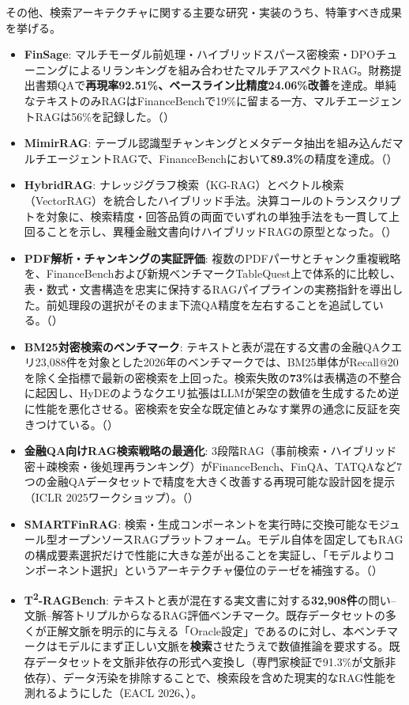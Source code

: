 その他、検索アーキテクチャに関する主要な研究・実装のうち、特筆すべき成果を挙げる。

\begin{itemize}
  \item \textbf{FinSage}: マルチモーダル前処理・ハイブリッドスパース密検索・DPOチューニングによるリランキングを組み合わせたマルチアスペクトRAG。財務提出書類QAで\textbf{再現率92.51\%、ベースライン比精度24.06\%改善}を達成。単純なテキストのみRAGはFinanceBenchで19\%に留まる一方、マルチエージェントRAGは56\%を記録した。（\cite{finsage2025}）
  \item \textbf{MimirRAG}: テーブル認識型チャンキングとメタデータ抽出を組み込んだマルチエージェントRAGで、FinanceBenchにおいて\textbf{89.3\%}の精度を達成。（\cite{mimirrag2026}）
  \item \textbf{HybridRAG}: ナレッジグラフ検索（KG-RAG）とベクトル検索（VectorRAG）を統合したハイブリッド手法。決算コールのトランスクリプトを対象に、検索精度・回答品質の両面でいずれの単独手法をも一貫して上回ることを示し、異種金融文書向けハイブリッドRAGの原型となった。（\cite{hybridrag2024}）
  \item \textbf{PDF解析・チャンキングの実証評価}: 複数のPDFパーサとチャンク重複戦略を、FinanceBenchおよび新規ベンチマークTableQuest上で体系的に比較し、表・数式・文書構造を忠実に保持するRAGパイプラインの実務指針を導出した。前処理段の選択がそのまま下流QA精度を左右することを追試している。（\cite{pdfparsingrag2026}）
  \item \textbf{BM25対密検索のベンチマーク}: テキストと表が混在する文書の金融QAクエリ23,088件を対象とした2026年のベンチマークでは、BM25単体がRecall@20を除く全指標で最新の密検索を上回った。検索失敗の\textbf{73\%}は表構造の不整合に起因し、HyDEのようなクエリ拡張はLLMが架空の数値を生成するため逆に性能を悪化させる。密検索を安全な既定値とみなす業界の通念に反証を突きつけている。（\cite{bm25hybrid2026}）
  \item \textbf{金融QA向けRAG検索戦略の最適化}: 3段階RAG（事前検索・ハイブリッド密＋疎検索・後処理再ランキング）がFinanceBench、FinQA、TATQAなど7つの金融QAデータセットで精度を大きく改善する再現可能な設計図を提示（ICLR 2025ワークショップ）。（\cite{ragretrieval2025}）
  \item \textbf{SMARTFinRAG}: 検索・生成コンポーネントを実行時に交換可能なモジュール型オープンソースRAGプラットフォーム。モデル自体を固定してもRAGの構成要素選択だけで性能に大きな差が出ることを実証し、「モデルよりコンポーネント選択」というアーキテクチャ優位のテーゼを補強する。（\cite{smartfinrag2025}）
  \item \textbf{T\textsuperscript{2}-RAGBench}: テキストと表が混在する実文書に対する\textbf{32,908件}の問い–文脈–解答トリプルからなるRAG評価ベンチマーク。既存データセットの多くが正解文脈を明示的に与える「Oracle設定」であるのに対し、本ベンチマークはモデルにまず正しい文脈を\textbf{検索}させたうえで数値推論を要求する。既存データセットを文脈非依存の形式へ変換し（専門家検証で91.3\%が文脈非依存）、データ汚染を排除することで、検索段を含めた現実的なRAG性能を測れるようにした（EACL 2026、\cite{x02t2ragbench2026}）。

\end{itemize}
